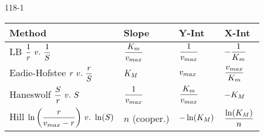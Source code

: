 \begin{mitframe}{118-1}
        
        
\begin{center}
\begin{tabular}
	{| >{\arraybackslash}m{4cm} | >{\arraybackslash}m{2cm} | >{\arraybackslash}m{2cm} | >{\arraybackslash}m{2cm} |}
\hline 
 
    Method &%
    Slope &%
    Y-Int &%
    X-Int \\ \hline
       
    LB \newline $\dfrac{1}{\pos}~v.~\dfrac{1}{\entropy}$ &%
    $\dfrac{\dilfac_{\mass}}{\vvel_{max}}$ &%
    $\dfrac{1}{\vvel_{max}}$ &%
	$-\dfrac{1}{\dilfac_{\mass}}$ \\ \hline

    Eadie-Hofstee \newline $\pos~v.~\dfrac{\pos}{\entropy}$ &%
    $\dilfac_{M}$ &%
    $\vvel_{max}$ &%
	$\dfrac{\vvel_{max}}{\dilfac_{\mass}}$ \\ \hline
    
    Haneswolf \newline $\dfrac{\entropy}{\pos}~v.~\entropy$ &%
    $\dfrac{1}{\vvel_{max}}$ &%
    $\dfrac{\dilfac_{\mass}}{\vvel_{max}}$ &%
	$-\dilfac_{M}$ \\ \hline
    
    Hill \newline $\ln\bigg(\dfrac{\pos}{\vvel_{max}-\pos}\bigg)~v.~\ln(\entropy)$ &%
    $n$ \newline (cooper.) &%
    $-\ln(\dilfac_{M})$ &%
	$\dfrac{\ln(\dilfac_{M})}{n}$ \\ \hline

\end{tabular}
\end{center}
\end{mitframe}